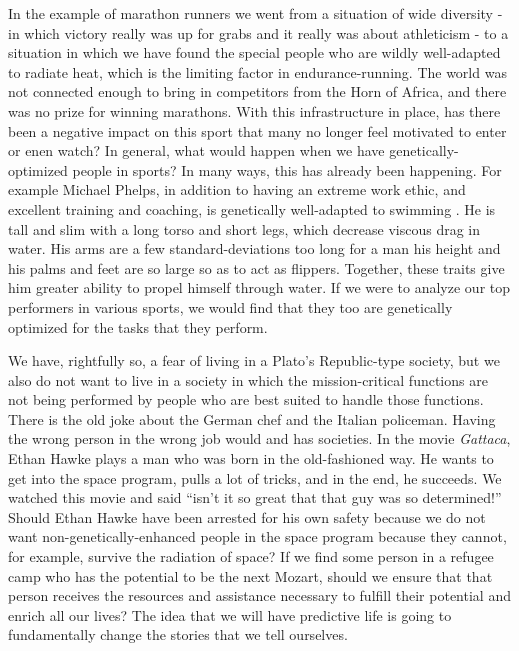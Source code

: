 In the example of marathon runners we went from a situation of wide diversity - in which victory really was up for grabs and it really was about athleticism - to a situation in which we have found the special people who are wildly well-adapted to radiate heat, which is the limiting factor in endurance-running.
The world was not connected enough to bring in competitors from the Horn of Africa, and there was no prize for winning marathons.
With this infrastructure in place, has there been a negative impact on this sport that many no longer feel motivated to enter or enen watch?
In general, what would happen when we have genetically-optimized people in sports?
In many ways, this has already been happening.
For example Michael Phelps, in addition to having an extreme work ethic, and excellent training and coaching, is genetically well-adapted to swimming \cite{Siebert2014}.
He is tall and slim with a long torso and short legs, which decrease viscous drag in water.
His arms are a few standard-deviations too long for a man his height and his palms and feet are so large so as to act as flippers.
Together, these traits give him greater ability to propel himself through water.
If we were to analyze our top performers in various sports, we would find that they too are genetically optimized for the tasks that they perform.

We have, rightfully so, a fear of living in a Plato's Republic-type society, but we also do not want to live in a society in which the mission-critical functions are not being performed by people who are best suited to handle those functions.
There is the old joke about the German chef and the Italian policeman.
Having the wrong person in the wrong job would and has societies.
In the movie \textit{Gattaca}, Ethan Hawke plays a man who was born in the old-fashioned way.
He wants to get into the space program, pulls a lot of tricks, and in the end, he succeeds.
We watched this movie and said ``isn't it so great that that guy was so determined!''
Should Ethan Hawke have been arrested for his own safety because we do not want non-genetically-enhanced people in the space program because they cannot, for example, survive the radiation of space?
If we find some person in a refugee camp who has the potential to be the next Mozart, should we ensure that that person receives the resources and assistance necessary to fulfill their potential and enrich all our lives?
The idea that we will have predictive life is going to fundamentally change the stories that we tell ourselves.

